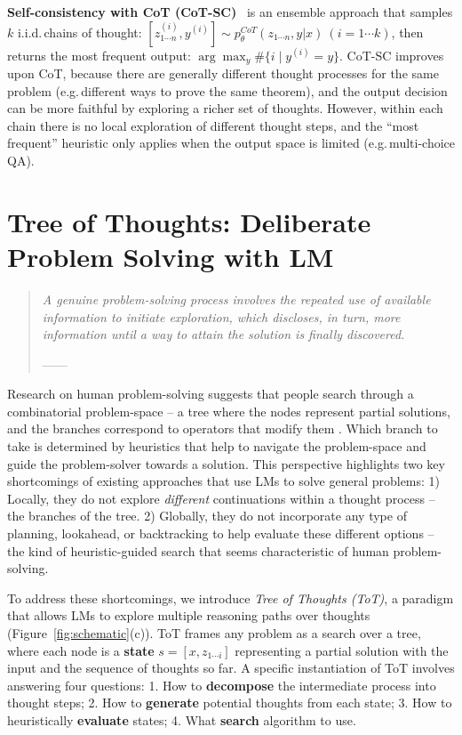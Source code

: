 \textbf{Self-consistency with CoT (CoT-SC)}~\citep{wang2022self} is an ensemble approach that samples $k$ i.i.d.\,chains of thought: $[z^{(i)}_{1\cdots n}, y^{(i)}] \sim p_\theta^{CoT}(z_{1\cdots n}, y | x) \ (i=1 \cdots k)$, then returns the most frequent output: $\arg \max_{y} \#\{i \mid y^{(i)}=y\}$. CoT-SC improves upon CoT, because there are generally different thought processes for the same problem (e.g.\,different ways to prove the same theorem), and the output decision can be more faithful by exploring a richer set of thoughts. However, within each chain there is no local exploration of different thought steps, and the ``most frequent'' heuristic only applies when the output space is limited (e.g.\,multi-choice QA).

\section{Tree of Thoughts: Deliberate Problem Solving with LM}

\begin{quote}
    \em{{A genuine problem-solving process} involves the repeated use of available information to initiate {exploration}, which discloses, in turn, more information until a way to attain the solution is finally discovered.}

    ------ \citet{newell1959report}

\end{quote}

Research on human problem-solving suggests that people search through a combinatorial problem-space -- a tree where the nodes represent partial solutions, and the branches correspond to operators that modify them \cite{newell1959report,newell1972human}. Which branch to take is determined by heuristics that help to navigate the problem-space and guide the problem-solver towards a solution. This perspective highlights two key shortcomings of existing approaches that use LMs to solve general problems: 1) Locally, they do not explore {\em different} continuations within a thought process -- the branches of the tree. 2) Globally, they do not incorporate any type of planning, lookahead, or backtracking to help evaluate these different options -- the kind of heuristic-guided search that seems characteristic of human problem-solving. 

To address these shortcomings, we introduce \emph{Tree of Thoughts (ToT)}, a paradigm that allows LMs to explore multiple reasoning paths over thoughts (Figure~\ref{fig:schematic}(c)). ToT frames any problem as a search over a tree, where each node is a \textbf{state} $s = [x, z_{1 \cdots i}]$ representing a partial solution with the input and the sequence of thoughts so far.  A specific instantiation of ToT involves answering four questions: 1. How to \textbf{decompose}  the intermediate process into thought steps; 2. How to \textbf{generate} potential thoughts from each state; 3. How to heuristically \textbf{evaluate} states; 4. What \textbf{search} algorithm to use. 

